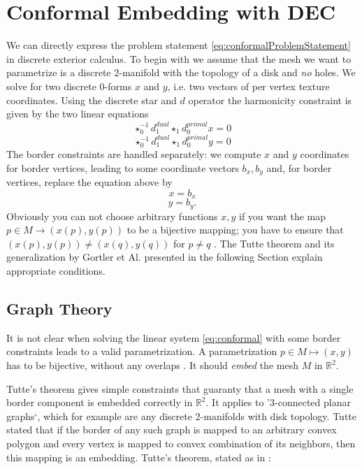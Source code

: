 \section{Conformal Embedding with DEC}

We can directly express the problem statement \ref{eq:conformalProblemStatement} in discrete exterior calculus. To begin with we assume that the mesh we want to parametrize is a discrete $2$-manifold with the topology of a disk and \emph{no} holes. We solve for two discrete $0$-forms $x$ and $y$, i.e. two vectors of per vertex texture coordinates. Using the discrete star and $d$ operator the harmonicity constraint is given by the two linear equations
\[\star_0^{-1} d_1^{dual} \star_1 d_0^{primal} x = 0\]
\begin{equation}\star_0^{-1} d_1^{dual} \star_1 d_0^{primal} y = 0 \label{eq:conformal}\end{equation}
The border constraints are handled separately: we compute $x$ and $y$ coordinates for border vertices, leading to some coordinate vectors $b_x, b_y$ and, for border vertices, replace the equation above by
\[ x = b_x\]
\[y = b_y.\]
Obviously you can not choose arbitrary functions $x,y$ if you want the map $p\in M \to (x(p),y(p))$ to be a bijective mapping; you have to ensure that $(x(p),y(p)) \neq (x(q),y(q))$ for $p\neq q$ . The Tutte theorem and its generalization by Gortler et Al. presented in the following Section explain appropriate conditions.

\subsection{Graph Theory}

It is not clear when solving the linear system \ref{eq:conformal} with some border constraints leads to a valid parametrization. A parametrization $p\in M \mapsto (x,y)$ has to be bijective, without any overlaps . It should \emph{embed} the mesh $M$ in $\mathbb R^2$.

Tutte's theorem gives simple constraints that guaranty that a mesh with a single border component is embedded correctly in $\mathbb R^2$. It applies to '3-connected planar graphs`, which for example are any discrete 2-manifolds with disk topology. Tutte stated that if the border of any such graph is mapped to an arbitrary convex polygon and every vertex is mapped to convex combination of its neighbors, then this mapping is an embedding. Tutte's theorem, stated as in \cite{Gortler}:

